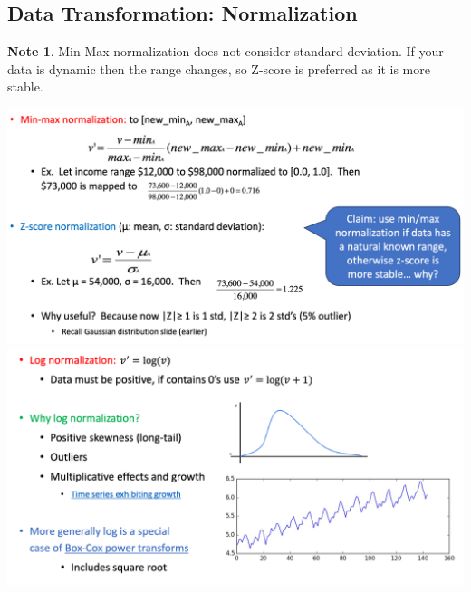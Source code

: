 \documentclass[11pt]{article}
\theoremstyle{definition}
\newtheorem{note}{Note}
\begin{document}
\subsection{Data Transformation: Normalization}
\begin{note}
    Min-Max normalization does not consider standard deviation. If your data is dynamic then the range changes, so Z-score is preferred as it is more stable.
\end{note}
\includegraphics[width=\textwidth]{18.png}
\includegraphics[width=\textwidth]{19.png}
\end{document}
